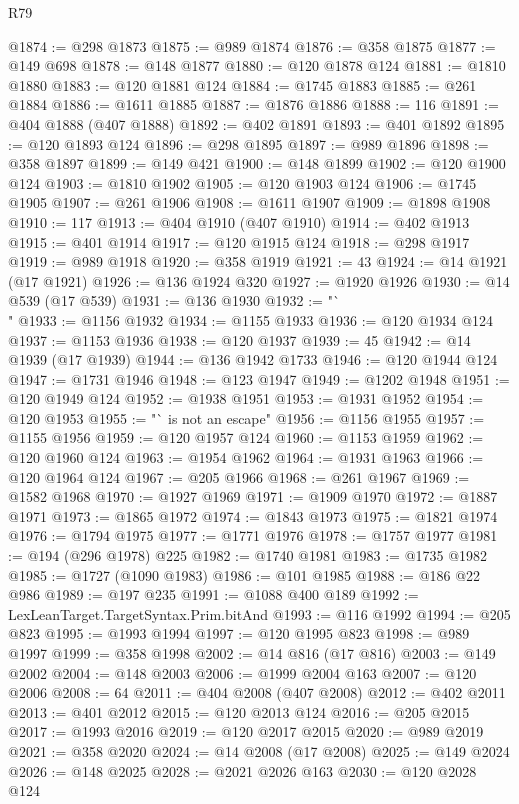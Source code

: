 \begin{lexlean}{R79}
\begin{coremodule}
@1874 := @298 @1873
@1875 := @989 @1874
@1876 := @358 @1875
@1877 := @149 @698
@1878 := @148 @1877
@1880 := @120 @1878 @124
@1881 := @1810 @1880
@1883 := @120 @1881 @124
@1884 := @1745 @1883
@1885 := @261 @1884
@1886 := @1611 @1885
@1887 := @1876 @1886
@1888 := 116
@1891 := @404 @1888 (@407 @1888)
@1892 := @402 @1891
@1893 := @401 @1892
@1895 := @120 @1893 @124
@1896 := @298 @1895
@1897 := @989 @1896
@1898 := @358 @1897
@1899 := @149 @421
@1900 := @148 @1899
@1902 := @120 @1900 @124
@1903 := @1810 @1902
@1905 := @120 @1903 @124
@1906 := @1745 @1905
@1907 := @261 @1906
@1908 := @1611 @1907
@1909 := @1898 @1908
@1910 := 117
@1913 := @404 @1910 (@407 @1910)
@1914 := @402 @1913
@1915 := @401 @1914
@1917 := @120 @1915 @124
@1918 := @298 @1917
@1919 := @989 @1918
@1920 := @358 @1919
@1921 := 43
@1924 := @14 @1921 (@17 @1921)
@1926 := @136 @1924 @320
@1927 := @1920 @1926
@1930 := @14 @539 (@17 @539)
@1931 := @136 @1930
@1932 := "`\\"
@1933 := @1156 @1932
@1934 := @1155 @1933
@1936 := @120 @1934 @124
@1937 := @1153 @1936
@1938 := @120 @1937
@1939 := 45
@1942 := @14 @1939 (@17 @1939)
@1944 := @136 @1942 @1733
@1946 := @120 @1944 @124
@1947 := @1731 @1946
@1948 := @123 @1947
@1949 := @1202 @1948
@1951 := @120 @1949 @124
@1952 := @1938 @1951
@1953 := @1931 @1952
@1954 := @120 @1953
@1955 := "` is not an escape"
@1956 := @1156 @1955
@1957 := @1155 @1956
@1959 := @120 @1957 @124
@1960 := @1153 @1959
@1962 := @120 @1960 @124
@1963 := @1954 @1962
@1964 := @1931 @1963
@1966 := @120 @1964 @124
@1967 := @205 @1966
@1968 := @261 @1967
@1969 := @1582 @1968
@1970 := @1927 @1969
@1971 := @1909 @1970
@1972 := @1887 @1971
@1973 := @1865 @1972
@1974 := @1843 @1973
@1975 := @1821 @1974
@1976 := @1794 @1975
@1977 := @1771 @1976
@1978 := @1757 @1977
@1981 := @194 (@296 @1978) @225
@1982 := @1740 @1981
@1983 := @1735 @1982
@1985 := @1727 (@1090 @1983)
@1986 := @101 @1985
@1988 := @186 @22 @986
@1989 := @197 @235
@1991 := @1088 @400 @189
@1992 := LexLeanTarget.TargetSyntax.Prim.bitAnd
@1993 := @116 @1992
@1994 := @205 @823
@1995 := @1993 @1994
@1997 := @120 @1995 @823
@1998 := @989 @1997
@1999 := @358 @1998
@2002 := @14 @816 (@17 @816)
@2003 := @149 @2002
@2004 := @148 @2003
@2006 := @1999 @2004 @163
@2007 := @120 @2006
@2008 := 64
@2011 := @404 @2008 (@407 @2008)
@2012 := @402 @2011
@2013 := @401 @2012
@2015 := @120 @2013 @124
@2016 := @205 @2015
@2017 := @1993 @2016
@2019 := @120 @2017 @2015
@2020 := @989 @2019
@2021 := @358 @2020
@2024 := @14 @2008 (@17 @2008)
@2025 := @149 @2024
@2026 := @148 @2025
@2028 := @2021 @2026 @163
@2030 := @120 @2028 @124

\end{coremodule}
\end{lexlean}
